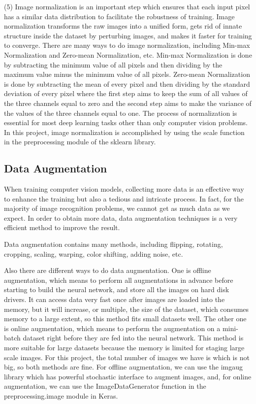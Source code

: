 \documentclass{article}
\begin{document}
(5) Image normalization is an important step which ensures that each input pixel has a similar data distribution to facilitate the robustness of training. Image normalization transforms the raw images into a unified form, gets rid of innate structure inside the dataset by perturbing images, and makes it faster for training to converge. There are many ways to do image normalization, including Min-max Normalization and Zero-mean Normalization, etc. Min-max Normalization is done by subtracting the minimum value of all pixels and then dividing by the maximum value minus the minimum value of all pixels. Zero-mean Normalization is done by subtracting the mean of every pixel and then dividing by the standard deviation of every pixel where the first step aims to keep the sum of all values of the three channels equal to zero and the second step aims to make the variance of the values of the three channels equal to one. The process of normalization is essential for most deep learning tasks other than only computer vision problems. In this project, image normalization is accomplished by using the scale function in the preprocessing module of the sklearn library.

\subsection{Data Augmentation}
When training computer vision models, collecting more data is an effective way to enhance the training but also a tedious and intricate process. In fact, for the majority of image recognition problems, we cannot get as much data as we expect. In order to obtain more data, data augmentation techniques is a very efficient method to improve the result.

Data augmentation contains many methods, including flipping, rotating, cropping, scaling, warping, color shifting, adding noise, etc.

Also there are different ways to do data augmentation. One is offline augmentation, which means to perform all augmentations in advance before starting to build the neural network, and store all the images on hard disk drivers. It can access data very fast once after images are loaded into the memory, but it will increase, or multiple, the size of the dataset, which consumes memory to a large extent, so this method fits small datasets well. The other one is online augmentation, which means to perform the augmentation on a mini-batch dataset right before they are fed into the neural network. This method is more suitable for large datasets because the memory is limited for staging large scale images. For this project, the total number of images we have is which is not big, so both methods are fine. For offline augmentation, we can use the imgaug library which has powerful stochastic interface to augment images, and, for online augmentation, we can use the ImageDataGenerator function in the preprocessing.image module in Keras.
\end{document}
